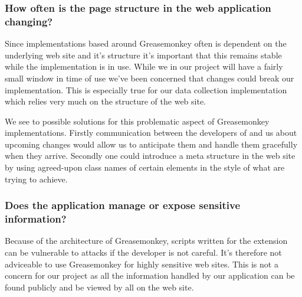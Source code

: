 \subsubsection{How often is the page structure in the web application
  changing?}

Since implementations based around Greasemonkey often is dependent on the
underlying web site and it's structure it's important that this remains
stable while the implementation is in use. While we in our project
will have a fairly small window in time of use we've been concerned
that changes could break our implementation. This is especially true
for our data collection implementation which relies very much on the structure
of the \urort{} web site.

We see to possible solutions for this problematic aspect of Greasemonkey
implementations. Firstly communication between the developers of
\urort{} and us about upcoming changes would allow us to anticipate
them and handle them gracefully when they arrive. Secondly one could
introduce a meta structure in the web site by using agreed-upon
class names of certain  elements in the style of
what %
are trying to achieve.

\subsubsection{Does the application manage or expose sensitive information?}

Because of the architecture of Greasemonkey, scripts written for the extension
can be vulnerable to attacks if the developer is not careful. It's
therefore not adviceable to use Greasemonkey for highly sensitive web sites.
This is not a concern for our project as all the information handled by our
application can be found publicly and be viewed by all on the \urort{}
web site.

